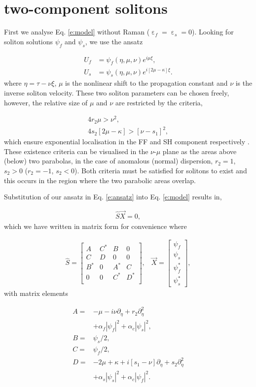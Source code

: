 \documentclass[reprint,
 amsmath,amssymb,
 pra,
]{revtex4-1}
\newcommand{\eq}[1]{
\begin{equation}\begin{aligned}
#1
\end{aligned}\end{equation}}
\DeclareMathOperator{\eps}{\varepsilon}
\begin{document}
\section{two-component solitons}\label{s:solitons}
First we analyse Eq. \eqref{e:model} without Raman ($\eps_f = \eps_s = 0$). Looking for soliton solutions $\psi_f$ and $\psi_s$, we use the ansatz 
\eq{\label{e:ansatz}
U_f &= \psi_f(\eta, \mu, \nu )e^{i\mu\xi},\\
U_s &= \psi_s(\eta, \mu, \nu)e^{i[2\mu- \kappa]\xi }.
}
where $\eta = \tau - \nu \xi$, $\mu$ is the nonlinear shift to the propagation constant and $\nu$ is the inverse soliton velocity. These two soliton parameters can be chosen freely, however, the relative size of $\mu$ and $\nu$ are restricted by the criteria, 
\eq{\label{e:criteria}
4r_2\mu > \nu^2, \\
4s_2[2\mu-\kappa] > [\nu-s_1]^2,
}
which ensure exponential localisation in the FF and SH component respectively \cite{Rowe2019TemporalNanowaveguides}. These existence criteria can be visualised in the $\nu$-$\mu$ plane as the areas above (below) two parabolas, in the case of anomalous (normal) dispersion, $r_2=1$, $s_2>0$ ($r_2=-1$, $s_2<0$). Both criteria must be satisfied for solitons to exist and this occurs in the region where the two parabolic areas overlap.

Substitution of our ansatz in Eq. \eqref{e:ansatz} into Eq. \eqref{e:model} results in,
\eq{\label{e:sol_mat}
\hat{S}\vec{X} = 0,
}
which we have written in matrix form for convenience where
\eq{
\hat{S} = \begin{bmatrix}
A & C^* & B & 0 \\
C & D & 0 & 0 \\
B^* & 0 & A^* & C \\
0 & 0 & C^* & D^* \\
\end{bmatrix}, \,\,\,\,\,
\vec{X} = \begin{bmatrix}
\psi_f \\
\psi_s \\
\psi_f^* \\
\psi_s^*
\end{bmatrix},
}
with matrix elements
\eq{
A =& - \mu - i\nu\partial_\eta + r_2\partial_\eta^2 \\
 &+ \alpha_f|\psi_f|^2 + \alpha_c |\psi_s|^2 , \\
B =& \psi_s/2 , \\
C =& \psi_f /2 , \\
D =& - 2\mu + \kappa + i[s_1-\nu]\partial_\eta + s_2 \partial_\eta^2 \\
 &+ \alpha_s |\psi_s|^2 + \alpha_c |\psi_f|^2.
}
\end{document}
